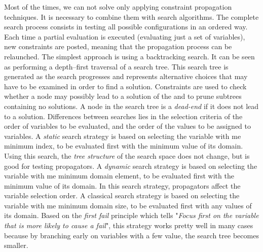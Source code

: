 Most of the times, we can not solve \csps{} only applying constraint propagation techniques. It is necessary to combine them with search algorithms. The complete search process consists in testing all possible configurations in an ordered way. Each time a partial evaluation is executed (evaluating just a set of variables), new constraints are posted, meaning that the propagation process can be relaunched. The simplest approach is using a backtracking search. It can be seen as performing a depth--first traversal of a search tree. This search tree is generated as the search progresses and represents alternative choices that may have to be examined in order to find a solution. Constraints are used to check whether a node may possibly lead to a solution of the \csp{} and to prune subtrees containing no solutions. A node in the search
tree is a \textit{dead-end} if it does not lead to a solution. Differences between searches lies in the selection criteria of the order of variables to be evaluated, and the order of the values to be assigned to variables. A \textit{static} search strategy is based on selecting the variable with me minimum index, to be evaluated first with the minimum value of its domain. Using this search, the \textit{tree structure} of the search space does not change, but is good for testing propagators. A \textit{dynamic} search strategy is based on selecting the variable with me minimum domain element, to be evaluated first with the minimum value of its domain. In this search strategy, propagators affect the variable selection order. A classical search strategy is based on selecting the variable with me minimum domain size, to be evaluated first with any values of its domain. Based on the \textit{first fail} principle which tells "\textit{Focus first on the variable that is more likely to cause a fail}",  this strategy works pretty well in many cases because by branching early on variables with a few value, the search tree becomes smaller.

